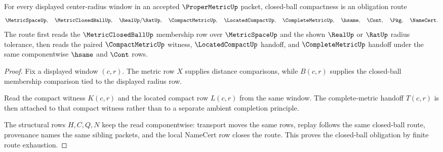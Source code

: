\begin{theorem}
\label{thm:propermetric-obligation-closed-ball}
For every displayed center-radius window in an accepted $\ProperMetricUp$ packet, closed-ball compactness is an obligation route
$$
\MetricSpaceUp,\quad
\MetricClosedBallUp,\quad
\RealUp/\RatUp,\quad
\CompactMetricUp,\quad
\LocatedCompactUp,\quad
\CompleteMetricUp,\quad
\hsame,\quad
\Cont,\quad
\Pkg,\quad
\NameCert .
$$
The route first reads the $\MetricClosedBallUp$ membership row over $\MetricSpaceUp$ and the shown $\RealUp$ or $\RatUp$ radius tolerance, then reads the paired $\CompactMetricUp$ witness, $\LocatedCompactUp$ handoff, and $\CompleteMetricUp$ handoff under the same componentwise $\hsame$ and $\Cont$ rows.
\end{theorem}
\begin{proof}
Fix a displayed window $(c,r)$. The metric row $X$ supplies distance comparisons, while $B(c,r)$ supplies the closed-ball membership comparison tied to the displayed radius row.

Read the compact witness $K(c,r)$ and the located compact row $L(c,r)$ from the same window. The complete-metric handoff $T(c,r)$ is then attached to that compact witness rather than to a separate ambient completion principle.

The structural rows $H,C,Q,N$ keep the read componentwise: transport moves the same rows, replay follows the same closed-ball route, provenance names the same sibling packets, and the local NameCert row closes the route. This proves the closed-ball obligation by finite route exhaustion.
\end{proof}

